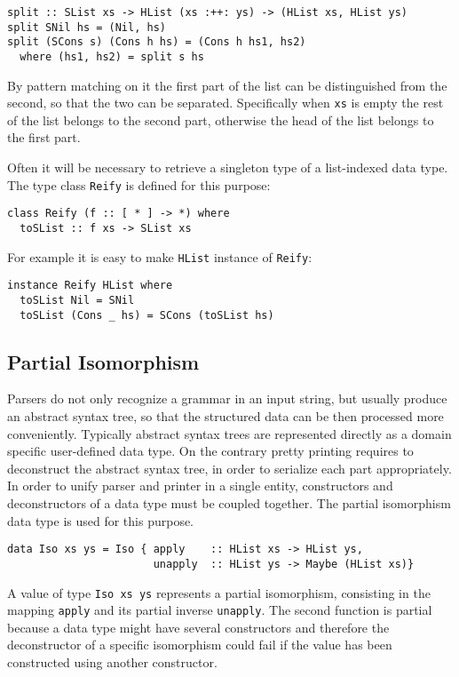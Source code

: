 \documentclass[../Thesis.tex]{subfiles}
\begin{document}
\begin{verbatim}
split :: SList xs -> HList (xs :++: ys) -> (HList xs, HList ys)
split SNil hs = (Nil, hs) 
split (SCons s) (Cons h hs) = (Cons h hs1, hs2)
  where (hs1, hs2) = split s hs
\end{verbatim}
	By pattern matching on it the first part of the list can be distinguished from 
	the second, so that the two can be separated.
	Specifically when \texttt{xs} is empty the rest of the list belongs
	to the second part, otherwise the head of the list belongs
	to the first part.
	
	Often it will be necessary to retrieve a singleton type of a list-indexed data 
	type. The type class \texttt{Reify} is defined for this purpose:
	
\begin{verbatim}
class Reify (f :: [ * ] -> *) where
  toSList :: f xs -> SList xs
\end{verbatim}

	For example it is easy to make \texttt{HList} instance of \texttt{Reify}:
\begin{verbatim}
instance Reify HList where
  toSList Nil = SNil
  toSList (Cons _ hs) = SCons (toSList hs)
\end{verbatim}	
	
\subsection{Partial Isomorphism}	
\label{subsec:PartIso}
Parsers do not only recognize a grammar in an input string, but usually
produce an abstract syntax tree, so that the structured data can be
then processed more conveniently. 
Typically abstract syntax trees are represented directly as a domain
specific user-defined data type. 
On the contrary pretty printing requires to deconstruct the abstract syntax tree, in order to serialize each part appropriately.
In order to unify parser and printer in a single entity, constructors
and deconstructors of a data type must be coupled together.
The partial isomorphism data type is used for this purpose.

\begin{verbatim}
data Iso xs ys = Iso { apply    :: HList xs -> HList ys, 
                       unapply  :: HList ys -> Maybe (HList xs)}
\end{verbatim}

A value of type \texttt{Iso xs ys} represents a partial isomorphism, consisting in the mapping \texttt{apply} and its partial inverse \texttt{unapply}.
The second function is partial because a data type might have
several constructors and therefore the deconstructor of
a specific isomorphism could fail if the value has been
constructed using another constructor.
\end{document}
